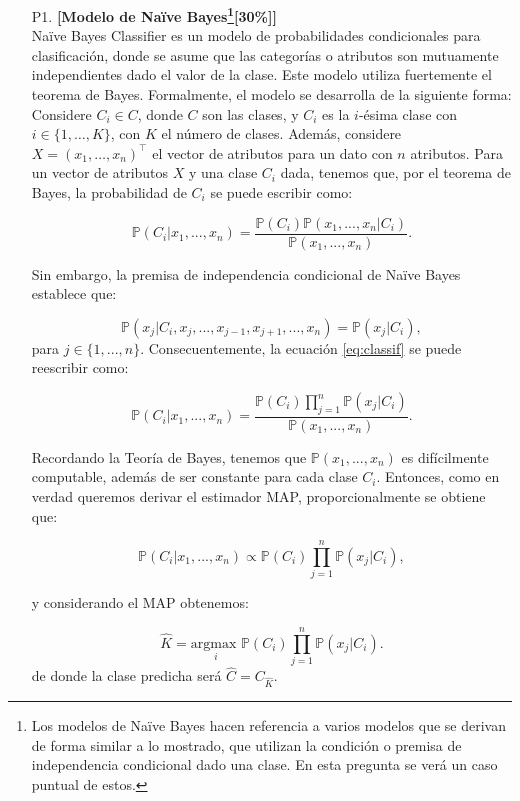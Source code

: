 \documentclass[letterpaper,11pt]{article}
\theoremstyle{plain}
\theoremstyle{definition}
\newcommand{\1}{\mathbbm{1}}
\begin{document}
\begin{enumerate}


\item [P1.]\textbf{[Modelo de Naïve Bayes\footnote{Los modelos de Naïve Bayes hacen referencia a varios modelos que se derivan de forma similar a lo mostrado, que utilizan la condición o premisa de independencia condicional dado una clase. En esta pregunta se verá un caso puntual de estos.}[30\%]]}\\
Naïve Bayes Classifier es un modelo de probabilidades condicionales para clasificación, donde se asume que las categorías o atributos son mutuamente independientes dado el valor de la clase. Este modelo utiliza fuertemente el teorema de Bayes. Formalmente, el modelo se desarrolla de la siguiente forma: Considere $C_i\in C$, donde $C$ son las clases, y $C_i$ es la $i$-ésima clase con $i\in \{1,\ldots,K\}$, con $K$ el número de clases. Además, considere $X=(x_1,\ldots,x_n)^\top$ el vector de atributos para un dato con $n$ atributos. Para un vector de atributos $X$ y una clase $C_i$ dada, tenemos que, por el teorema de Bayes, la probabilidad de $C_i$ se puede escribir como:

\begin{equation}
    \mathbb{P}(C_i|x_1,...,x_n) = \frac{\mathbb{P}(C_i)\mathbb{P}(x_1,...,x_n|C_i)}{\mathbb{P}(x_1,...,x_n)}. \label{eq:classif}
\end{equation}

Sin embargo, la premisa de independencia condicional de Naïve Bayes establece que:

\[\mathbb{P}(x_j|C_i,x_j,...,x_{j-1},x_{j+1},...,x_n) = \mathbb{P}(x_j|C_i),\]
para $j\in \{1,...,n\}$. Consecuentemente, la ecuación \eqref{eq:classif}  se puede reescribir como:

\[\mathbb{P}(C_i|x_1,...,x_n) = \frac{\mathbb{P}(C_i)\prod\limits_{j=1}^{n} \mathbb{P}(x_j|C_i)}{\mathbb{P}(x_1,...,x_n)}.\]

Recordando la Teoría de Bayes, tenemos que $\mathbb{P}(x_1,...,x_n)$ es difícilmente computable, además de ser constante para cada clase $C_i$. Entonces, como en verdad queremos derivar el estimador MAP, proporcionalmente se obtiene que:

\[\mathbb{P}(C_i|x_1,...,x_n)\propto\mathbb{P}(C_i)\prod\limits_{j=1}^{n} \mathbb{P}(x_j|C_i), \]

y considerando el MAP obtenemos:

\begin{equation}
    \hat{K} = \underset{i}{\text{argmax } }\mathbb{P}(C_i)\prod\limits_{j=1}^{n} \mathbb{P}(x_j|C_i).
    \label{eq:argmax}
\end{equation}
de donde la clase predicha será $\hat{C} = C_{\hat{K}}$.\\


\end{enumerate}
\end{document}
